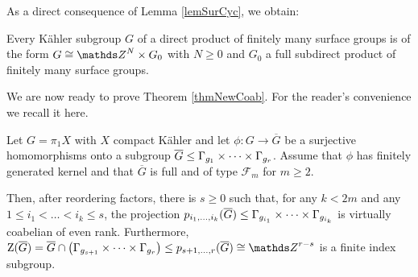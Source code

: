 As a direct consequence of Lemma \ref{lemSurCyc}, we obtain:

\begin{corollary}
 Every K\"ahler subgroup $G$ of a direct product of finitely many surface groups is of the form $G\cong \ZZ^N \times G_0$ with $N\geq 0$ and $G_0$ a full subdirect product of finitely many surface groups.
\end{corollary}

We are now ready to prove Theorem \ref{thmNewCoab}. For the reader's convenience we recall it here.

\begin{thmIntro1}
 Let $G=\pi_1 X$ with $X$ compact K\"ahler and let $\phi: G \rightarrow \overline{G}$ be a surjective homomorphisms onto a subgroup $\overline{G}\leq \Gamma_{g_1}\times \dots \times \Gamma_{g_r}$. Assume that $\phi$ has finitely generated kernel and that $\overline{G}$ is full and of type $\mathcal{F}_m$ for $m\geq 2$.
 
 Then, after reordering factors, there is $s\geq 0$ such that, for any $k< 2m$ and any $1\leq i_1 < \dots < i_k\leq s$, the projection $p_{i_1,\dots,i_k}(\overline{G})\leq \Gamma_{g_{i_1}}\times \dots \times \Gamma_{g_{i_k}}$ is virtually coabelian of even rank. Furthermore, $\mathrm{Z}(\overline{G})= \overline{G} \cap \left(\G_{g_{s+1}}\times \dots \times \G_{g_r}\right)\leq p_{s+1,\dots,r}(\overline{G})\cong \ZZ^{r-s}$ is a finite index subgroup. 
\end{thmIntro1}

